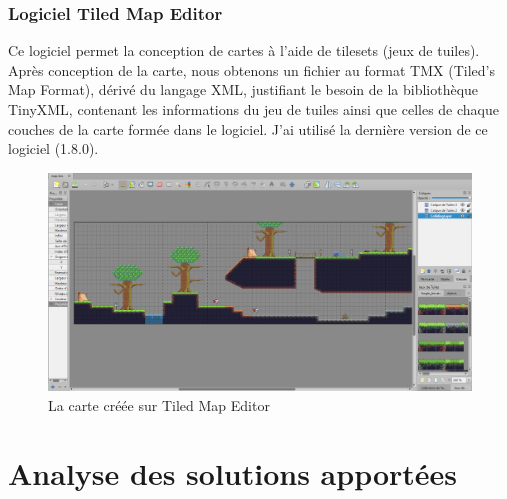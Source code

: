 \documentclass[12pt, openany]{report}
\begin{document}
\subsection{Logiciel Tiled Map Editor}
Ce logiciel permet la conception de cartes \`a l'aide de tilesets (jeux de tuiles). Apr\`es conception de la carte, nous obtenons un fichier au format TMX (Tiled's Map Format), d\'eriv\'e du langage XML, justifiant le besoin de la biblioth\`eque TinyXML, contenant les informations du jeu de tuiles ainsi que celles de chaque couches de la carte form\'ee dans le logiciel. J'ai utilis\'e la derni\`ere version de ce logiciel (1.8.0).
\begin{figure}[!h]
\centering
\includegraphics[scale=0.3]{tmxMap.png}
\caption{La carte cr\'e\'ee sur Tiled Map Editor}
\end{figure}

\chapter{Analyse des solutions apport\'ees}
\vspace{1cm}
\end{document}
